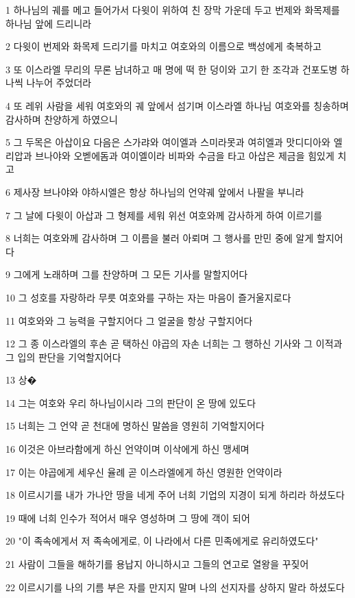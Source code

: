 \par 1 하나님의 궤를 메고 들어가서 다윗이 위하여 친 장막 가운데 두고 번제와 화목제를 하나님 앞에 드리니라
\par 2 다윗이 번제와 화목제 드리기를 마치고 여호와의 이름으로 백성에게 축복하고
\par 3 또 이스라엘 무리의 무론 남녀하고 매 명에 떡 한 덩이와 고기 한 조각과 건포도병 하나씩 나누어 주었더라
\par 4 또 레위 사람을 세워 여호와의 궤 앞에서 섬기며 이스라엘 하나님 여호와를 칭송하며 감사하며 찬양하게 하였으니
\par 5 그 두목은 아삽이요 다음은 스가랴와 여이엘과 스미라못과 여히엘과 맛디디아와 엘리압과 브나야와 오벧에돔과 여이엘이라 비파와 수금을 타고 아삽은 제금을 힘있게 치고
\par 6 제사장 브나야와 야하시엘은 항상 하나님의 언약궤 앞에서 나팔을 부니라
\par 7 그 날에 다윗이 아삽과 그 형제를 세워 위선 여호와께 감사하게 하여 이르기를
\par 8 너희는 여호와께 감사하며 그 이름을 불러 아뢰며 그 행사를 만민 중에 알게 할지어다
\par 9 그에게 노래하며 그를 찬양하며 그 모든 기사를 말할지어다
\par 10 그 성호를 자랑하라 무릇 여호와를 구하는 자는 마음이 즐거울지로다
\par 11 여호와와 그 능력을 구할지어다 그 얼굴을 항상 구할지어다
\par 12 그 종 이스라엘의 후손 곧 택하신 야곱의 자손 너희는 그 행하신 기사와 그 이적과 그 입의 판단을 기억할지어다
\par 13 상�
\par 14 그는 여호와 우리 하나님이시라 그의 판단이 온 땅에 있도다
\par 15 너희는 그 언약 곧 천대에 명하신 말씀을 영원히 기억할지어다
\par 16 이것은 아브라함에게 하신 언약이며 이삭에게 하신 맹세며
\par 17 이는 야곱에게 세우신 율례 곧 이스라엘에게 하신 영원한 언약이라
\par 18 이르시기를 내가 가나안 땅을 네게 주어 너희 기업의 지경이 되게 하리라 하셨도다
\par 19 때에 너희 인수가 적어서 매우 영성하며 그 땅에 객이 되어
\par 20 "이 족속에게서 저 족속에게로, 이 나라에서 다른 민족에게로 유리하였도다"
\par 21 사람이 그들을 해하기를 용납지 아니하시고 그들의 연고로 열왕을 꾸짖어
\par 22 이르시기를 나의 기름 부은 자를 만지지 말며 나의 선지자를 상하지 말라 하셨도다
